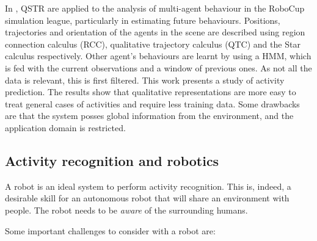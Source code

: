 In \citep{Young13_PredcitingSituatedBehaviour,Young14_EffectsTraining}, QSTR are applied to the analysis of multi-agent behaviour in the RoboCup simulation league, particularly in estimating future behaviours. 
Positions, trajectories and orientation of the agents in the scene are described using region connection calculus (RCC), qualitative trajectory calculus (QTC) and the Star calculus respectively. 
Other agent's behaviours are learnt by using a HMM, which is fed with the current observations and a window of previous ones. 
As not all the data is relevant, this is first filtered. 
This work presents a study of activity prediction.
The results show that qualitative representations are more easy to treat general cases of activities and require less training data.
Some drawbacks are that the system posses global information from the environment, and the application domain is restricted.








\subsection{Activity recognition and robotics} \label{sec_ASP}
A robot is an ideal system to perform activity recognition. 
This is, indeed, a desirable skill for an autonomous robot that will share an environment with people.
The robot needs to be \textit{aware} of the surrounding humans.

Some important challenges to consider with a robot are:

